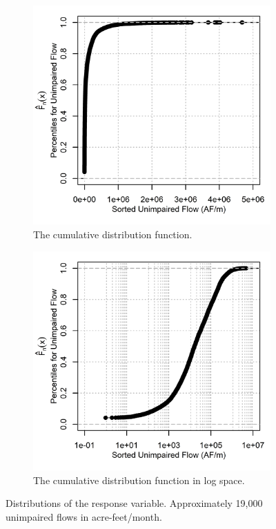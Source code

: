 \begin{figure}
	\centering
	\begin{subfigure}{.5\textwidth}
  		\centering
 		 \includegraphics[width=\textwidth, trim={0 0 0 0}, clip=true]{plots/rplot01_flowcdf2.png}
  		\caption{The cumulative distribution function. \newline}
  		\label{fig:flowcdf}
	\end{subfigure}%
	\begin{subfigure}{.5\textwidth}
  		\centering
  		\includegraphics[width=\textwidth, trim={0 0 0 0}, clip=true]{plots/rplot01_flowcdf.png}
  		\caption{The cumulative distribution function in log space.}
  		\label{fig:histkdp}
	\end{subfigure}
	\caption{Distributions of the response variable. Approximately 19,000 unimpaired flows in acre-feet/month.}
	\label{fig:flows}
\end{figure}

